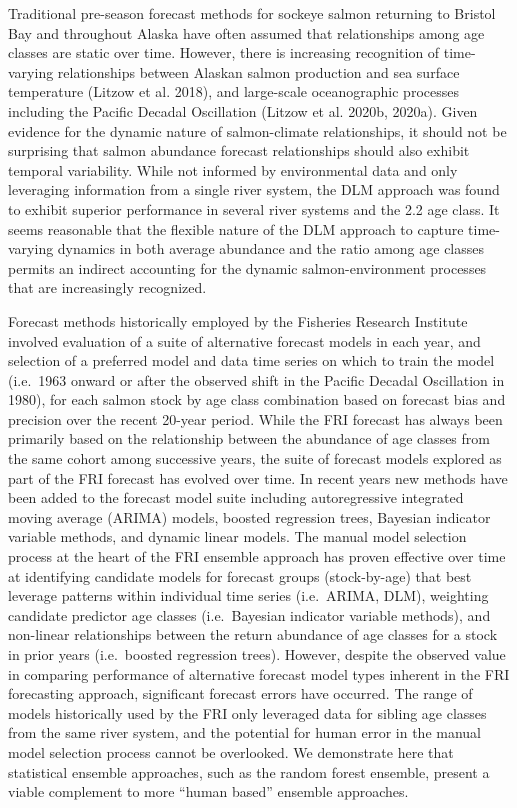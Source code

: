 \documentclass[
]{article}
\begin{document}
Traditional pre-season forecast methods for sockeye salmon returning to Bristol Bay and throughout Alaska have often assumed that relationships among age classes are static over time. However, there is increasing recognition of time-varying relationships between Alaskan salmon production and sea surface temperature (Litzow et al. 2018), and large-scale oceanographic processes including the Pacific Decadal Oscillation (Litzow et al. 2020b, 2020a). Given evidence for the dynamic nature of salmon-climate relationships, it should not be surprising that salmon abundance forecast relationships should also exhibit temporal variability. While not informed by environmental data and only leveraging information from a single river system, the DLM approach was found to exhibit superior performance in several river systems and the 2.2 age class. It seems reasonable that the flexible nature of the DLM approach to capture time-varying dynamics in both average abundance and the ratio among age classes permits an indirect accounting for the dynamic salmon-environment processes that are increasingly recognized.

Forecast methods historically employed by the Fisheries Research Institute involved evaluation of a suite of alternative forecast models in each year, and selection of a preferred model and data time series on which to train the model (i.e.~1963 onward or after the observed shift in the Pacific Decadal Oscillation in 1980), for each salmon stock by age class combination based on forecast bias and precision over the recent 20-year period. While the FRI forecast has always been primarily based on the relationship between the abundance of age classes from the same cohort among successive years, the suite of forecast models explored as part of the FRI forecast has evolved over time. In recent years new methods have been added to the forecast model suite including autoregressive integrated moving average (ARIMA) models, boosted regression trees, Bayesian indicator variable methods, and dynamic linear models. The manual model selection process at the heart of the FRI ensemble approach has proven effective over time at identifying candidate models for forecast groups (stock-by-age) that best leverage patterns within individual time series (i.e.~ARIMA, DLM), weighting candidate predictor age classes (i.e.~Bayesian indicator variable methods), and non-linear relationships between the return abundance of age classes for a stock in prior years (i.e.~boosted regression trees). However, despite the observed value in comparing performance of alternative forecast model types inherent in the FRI forecasting approach, significant forecast errors have occurred. The range of models historically used by the FRI only leveraged data for sibling age classes from the same river system, and the potential for human error in the manual model selection process cannot be overlooked. We demonstrate here that statistical ensemble approaches, such as the random forest ensemble, present a viable complement to more ``human based'' ensemble approaches.
\end{document}
